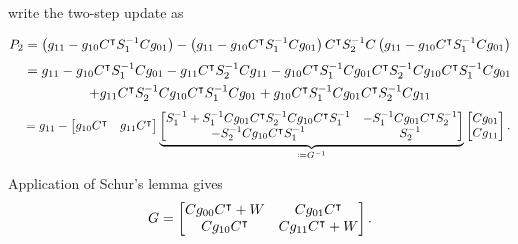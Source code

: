 write the two-step update as
\begin{fullwidth}\vspace{-\baselineskip}
\begin{equation}
  P_2 = \left(g_{11} - g_{10}C^{\intercal} S_1^{-1} C g_{01}\right)
  - \left(g_{11} - g_{10}C^{\intercal} S_1^{-1} C g_{01}\right)
  C^{\intercal} S_2^{-1} C \left(g_{11} - g_{10}C^{\intercal} S_1^{-1} C g_{01}\right)
\end{equation}
\vspace{-\baselineskip}
\begin{multline}
  \hphantom{P_2} = g_{11} - g_{10}C^{\intercal} S_1^{-1} C g_{01}
  - g_{11}C^{\intercal} S_2^{-1} C g_{11}
  - g_{10}C^{\intercal} S_1^{-1} C g_{01} C^{\intercal} S_2^{-1} C g_{10}C^{\intercal} S_1^{-1} C g_{01}\\
  + g_{11}C^{\intercal} S_2^{-1} C g_{10}C^{\intercal} S_1^{-1} C g_{01}
  + g_{10}C^{\intercal} S_1^{-1} C g_{01} C^{\intercal} S_2^{-1} C g_{11}
\end{multline}
\vspace{-\baselineskip}
\begin{equation}
  \hphantom{P_2} = g_{11} - \begin{bmatrix}g_{10}C^{\intercal} & g_{11}C^{\intercal}\end{bmatrix}
  \underbrace{
  \begin{bmatrix}
  S_1^{-1} + S_1^{-1} C g_{01} C^{\intercal} S_2^{-1} C g_{10}C^{\intercal} S_1^{-1} &
  -S_1^{-1} C g_{01} C^{\intercal} S_2^{-1} \\
  -S_2^{-1} C g_{10} C^{\intercal} S_1^{-1}&
  S_2^{-1}
  \end{bmatrix}
  }_{\coloneqq G^{-1}}
  \begin{bmatrix}C g_{01} \\ C g_{11}\end{bmatrix}.
\end{equation}
\end{fullwidth}
Application of Schur's lemma gives
\begin{equation}
  G
  =
  \begin{bmatrix}
  C g_{00} C^{\intercal} + W &
  C g_{01} C^{\intercal} \\
  C g_{10} C^{\intercal} &
  C g_{11} C^{\intercal} + W
  \end{bmatrix}.
\end{equation}

